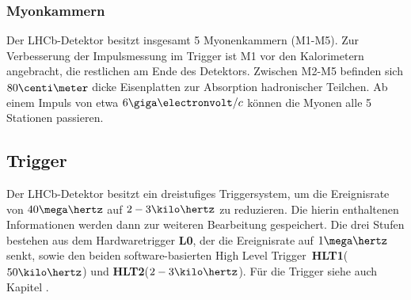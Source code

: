 \subsubsection{Myonkammern}
Der LHCb-Detektor besitzt insgesamt 5 Myonenkammern (M1-M5). Zur Verbesserung der Impulsmessung im Trigger ist M1 vor den Kalorimetern angebracht, die restlichen am Ende des Detektors. Zwischen M2-M5 befinden sich $80\centi\meter$ dicke Eisenplatten zur Absorption hadronischer Teilchen. Ab einem Impuls von etwa $6\giga\electronvolt/c$ können die Myonen alle 5 Stationen passieren. \cite{thesis_linn}

\subsection{Trigger}
Der LHCb-Detektor besitzt ein dreistufiges Triggersystem, um die Ereignisrate von $40\mega\hertz$ auf $2-3\kilo\hertz$ zu reduzieren. Die hierin enthaltenen Informationen werden dann zur weiteren Bearbeitung gespeichert. Die drei Stufen bestehen aus dem Hardwaretrigger \textbf{L0}, der die Ereignisrate auf $1\mega\hertz$ senkt, sowie den beiden software-basierten \glqq High Level Trigger\grqq\ \textbf{HLT1}($50\kilo\hertz$) und \textbf{HLT2}($2-3\kilo\hertz$). Für die Trigger siehe auch Kapitel \label{kap:trigger}.